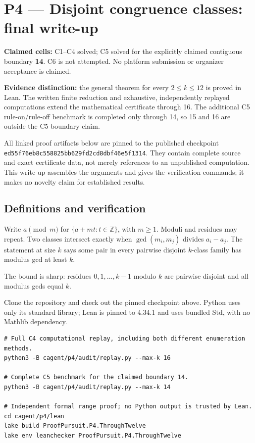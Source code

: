 \documentclass[11pt,a4paper]{article}
\begin{document}
\section{P4 --- Disjoint congruence classes: final write-up}\label{p4-disjoint-congruence-classes-final-write-up}

\textbf{Claimed cells:} C1--C4 solved; C5 solved for the explicitly claimed contiguous boundary \textbf{14}. C6 is not attempted. No platform submission or organizer acceptance is claimed.

\textbf{Evidence distinction:} the general theorem for every \(2\le k\le12\) is proved in Lean. The written finite reduction and exhaustive, independently replayed computations extend the mathematical certificate through 16. The additional C5 rule-on/rule-off benchmark is completed only through 14, so 15 and 16 are outside the C5 boundary claim.

All linked proof artifacts below are pinned to the published checkpoint \texttt{ed55f76e\allowbreak{}b8c55882\allowbreak{}5bb629fd\allowbreak{}2cd8dbf4\allowbreak{}6e5f1314}. They contain complete source and exact certificate data, not merely references to an unpublished computation. This write-up assembles the arguments and gives the verification commands; it makes no novelty claim for established results.

\subsection{Definitions and verification}\label{definitions-and-verification}

Write \(a\pmod m\) for \(\{a+mt:t\in\mathbb Z\}\), with \(m\ge1\). Moduli and residues may repeat. Two classes intersect exactly when \(\gcd(m_i,m_j)\) divides \(a_i-a_j\). The statement at size \(k\) says some pair in every pairwise disjoint \(k\)-class family has modulus gcd at least \(k\).

The bound is sharp: residues \(0,1,\ldots,k-1\) modulo \(k\) are pairwise disjoint and all modulus gcds equal \(k\).

Clone the repository and check out the pinned checkpoint above. Python uses only its standard library; Lean is pinned to 4.34.1 and uses bundled Std, with no Mathlib dependency.

\begin{Verbatim}[breaklines,breakanywhere,fontsize=\footnotesize]
# Full C4 computational replay, including both different enumeration methods.
python3 -B cagent/p4/audit/replay.py --max-k 16

# Complete C5 benchmark for the claimed boundary 14.
python3 -B cagent/p4/audit/replay.py --max-k 14

# Independent formal range proof; no Python output is trusted by Lean.
cd cagent/p4/lean
lake build ProofPursuit.P4.ThroughTwelve
lake env leanchecker ProofPursuit.P4.ThroughTwelve
\end{Verbatim}
\end{document}
